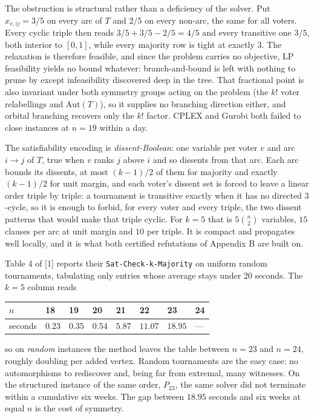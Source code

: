 \documentclass[
]{article}
\newcounter{none} %
\begin{document}
The obstruction is structural rather than a deficiency of the solver.
Put \(x_{v,ij} = 3/5\) on every arc of \(T\) and \(2/5\) on every
non-arc, the same for all voters. Every cyclic triple then reads
\(3/5 + 3/5 - 2/5 = 4/5\) and every transitive one \(3/5\), both
interior to \([0,1]\), while every majority row is tight at exactly
\(3\). The relaxation is therefore feasible, and since the problem
carries no objective, LP feasibility yields no bound whatever:
branch-and-bound is left with nothing to prune by except infeasibility
discovered deep in the tree. That fractional point is also invariant
under both symmetry groups acting on the problem (the \(k!\) voter
relabellings and \(\mathrm{Aut}(T)\)), so it supplies no branching
direction either, and orbital branching recovers only the \(k!\) factor.
CPLEX and Gurobi both failed to close instances at \(n = 19\) within a
day.

The satisfiability encoding is \emph{dissent-Boolean}: one variable per
voter \(v\) and arc \(i \to j\) of \(T\), true when \(v\) ranks \(j\)
above \(i\) and so dissents from that arc. Each arc bounds its dissents,
at most \((k-1)/2\) of them for majority and exactly \((k-1)/2\) for
unit margin, and each voter's dissent set is forced to leave a linear
order triple by triple: a tournament is transitive exactly when it has
no directed \(3\)-cycle, so it is enough to forbid, for every voter and
every triple, the two dissent patterns that would make that triple
cyclic. For \(k = 5\) that is \(5\binom{n}{2}\) variables, \(15\)
clauses per arc at unit margin and \(10\) per triple. It is compact and
propagates well locally, and it is what both certified refutations of
Appendix B are built on.

Table 4 of {[}1{]} reports their \texttt{Sat-Check-k-Majority} on
uniform random tournaments, tabulating only entries whose average stays
under 20 seconds. The \(k = 5\) column reads

{\def\LTcaptype{none} %
\begin{longtable}[]{@{}llllllll@{}}
\toprule\noalign{}
\(n\) & 18 & 19 & 20 & 21 & 22 & 23 & 24 \\
\midrule\noalign{}
\endhead
\bottomrule\noalign{}
\endlastfoot
seconds & \(0.23\) & \(0.35\) & \(0.54\) & \(5.87\) & \(11.07\) &
\(18.95\) & --- \\
\end{longtable}
}

so on \emph{random} instances the method leaves the table between
\(n = 23\) and \(n = 24\), roughly doubling per added vertex. Random
tournaments are the easy case: no automorphisms to rediscover and, being
far from extremal, many witnesses. On the structured instance of the
same order, \(P_{23}\), the same solver did not terminate within a
cumulative six weeks. The gap between \(18.95\) seconds and six weeks at
equal \(n\) is the cost of symmetry.
\end{document}
